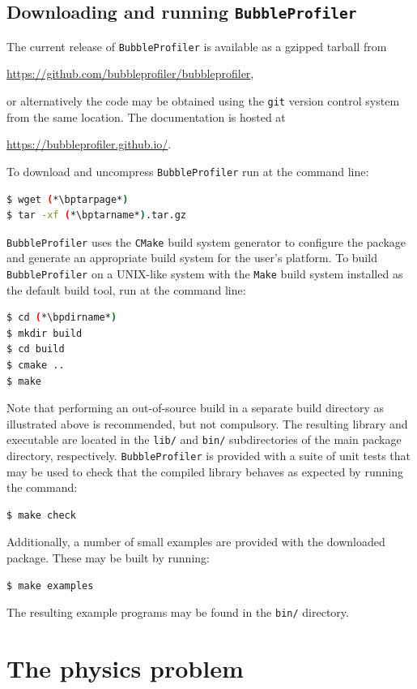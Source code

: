\documentclass[final,3p,11pt,pdflatex]{elsarticle}
\makeatletter
\newcommand{\bpversion}{1.0.0}
\newcommand{\bpgitrepo}{%
  \url{https://github.com/bubbleprofiler/bubbleprofiler}\xspace}
\newcommand{\bphomepage}{\bpgitrepo}
\newcommand{\bpdirname}{bubbleprofiler-\bpversion}
\newcommand{\bptarname}{v\bpversion}
\newcommand{\bptarpage}{%
  \url{https://github.com/bubbleprofiler/bubbleprofiler/archive/\bptarname.tar.gz}\xspace}
\newcommand{\docspage}{%
  \url{https://bubbleprofiler.github.io/}\xspace}
\newcommand{\bp}{\texttt{BubbleProfiler}\@\xspace}
\newcommand{\cmake}{\texttt{CMake}\@\xspace}
\newcommand{\code}[1]{\ifmmode\text{\nolinkurl{#1}}\else\nolinkurl{#1}\fi}
\newcommand{\git}{\texttt{git}\@\xspace}
\newcommand{\make}{\texttt{Make}\@\xspace}
\makeatother
\begin{document}
\subsection{Downloading and running \bp}
The current release of \bp is available as a gzipped tarball from
\begin{center}
  \bphomepage ,
\end{center}
or alternatively the code may be obtained using the \git version
control system from the same location.  The documentation is hosted at
\begin{center}
  \docspage .
\end{center}
%
To download and uncompress \bp run at the command
line:
%
\begin{lstlisting}[language=bash]
$ wget (*\bptarpage*)
$ tar -xf (*\bptarname*).tar.gz
\end{lstlisting}
\bp uses the \cmake build system generator to configure the package and
generate an appropriate build system for the user's platform.  To build \bp on
a UNIX-like system with the \make build system installed as the default build
tool, run at the command line:
\begin{lstlisting}[language=bash]
$ cd (*\bpdirname*)
$ mkdir build
$ cd build
$ cmake ..
$ make
\end{lstlisting}
%
Note that performing an out-of-source build in a separate build directory as
illustrated above is recommended, but not compulsory.  The resulting library
and executable are located in the \code{lib/} and \code{bin/}
subdirectories of the main package directory, respectively.
\bp is provided with a suite of unit tests that may be used to
check that the compiled library behaves as expected by running the command:
\begin{lstlisting}[language=bash]
$ make check
\end{lstlisting}
Additionally, a number of small examples are provided with the downloaded
package.  These may be built by running:
\begin{lstlisting}[language=bash]
$ make examples
\end{lstlisting}
The resulting example programs may be found in the \code{bin/}
directory.

\section{The physics problem}
\label{sec:PhysicalProblem}
\end{document}
